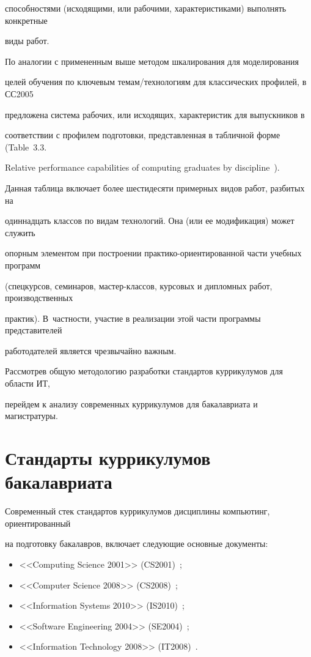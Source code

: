 способностями (исходящими, или рабочими, характеристиками) выполнять конкретные 

виды работ.

      

      По аналогии с примененным выше методом шкалирования для моделирования 

целей обучения по ключевым темам/технологиям для классических профилей, в СС2005 

предложена система рабочих, или исходящих, характеристик для выпускников в 

соответствии с профилем подготовки, представленная в табличной форме (Table~3.3. 

Relative performance capabilities of computing graduates by discipline~\cite{14-s}). 



Данная таблица включает более шестидесяти примерных видов работ, разбитых на 

одиннадцать классов по видам технологий. Она (или ее модификация) может служить 

опорным элементом при построении прак\-ти\-ко-ориен\-ти\-ро\-ван\-ной час\-ти учебных программ 

(спецкурсов, семинаров, мас\-тер-клас\-сов, курсовых и дипломных работ, производственных 

практик). В~част\-ности, учас\-тие в реализации этой час\-ти программы представителей 

работодателей является чрезвычайно важным.



Рассмотрев общую методологию разработки стандартов куррикулумов для области ИТ, 

перейдем к анализу современных куррикулумов для бакалавриата и магистратуры. 



\section{Стандарты куррикулумов бакалавриата}



Современный стек стандартов куррикулумов дисциплины компьютинг, ориентированный 

на подготовку бакалавров, включает следующие основные документы: 

\begin{itemize}

\item <<Computing Science 2001>> (CS2001)~\cite{8-s}; 

\item <<Computer Science 2008>> (CS2008)~\cite{16-s}; 

\item <<Information Systems 2010>> (IS2010)~\cite{18-s}; 

\item <<Software Engineering 2004>> (SE2004)~\cite{14-s, 15-s}; 

\item <<Information Technology 2008>> (IT2008)~\cite{17-s}.

\end{itemize}



